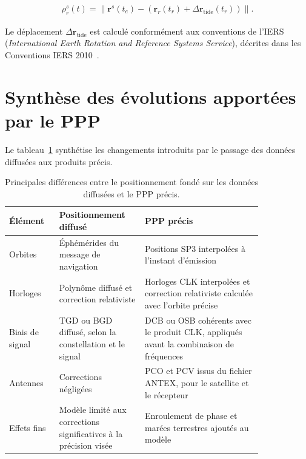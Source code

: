 \begin{align}
\rho_r^s(t)
=
\left\|
\mathbf r^s(t_e)
-\left(\mathbf r_r(t_r)
+\Delta\mathbf r_{\mathrm{tide}}(t_r)\right)
\right\|.
\label{eq:solid_tides_geometry}
\end{align}

Le déplacement $\Delta\mathbf r_{\mathrm{tide}}$ est calculé conformément
aux conventions de l'IERS (\textit{International Earth Rotation and Reference
Systems Service}), décrites dans les Conventions IERS 2010~\cite{iers2010}.

\section{Synthèse des évolutions apportées par le PPP}

Le tableau~\ref{tab:broadcast_vs_ppp} synthétise les changements introduits par
le passage des données diffusées aux produits précis.

\begin{table}[htbp]
    \centering
    \small
    \renewcommand{\arraystretch}{1.25}
    \begin{tabular}{|p{0.16\linewidth}|p{0.27\linewidth}|p{0.40\linewidth}|}
        \hline
        \textbf{Élément} & \textbf{Positionnement diffusé} & \textbf{PPP précis} \\
        \hline
        Orbites
        & Éphémérides du message de navigation
        & Positions SP3 interpolées à l'instant d'émission \\
        \hline
        Horloges
        & Polynôme diffusé et correction relativiste
        & Horloges CLK interpolées et correction relativiste calculée avec
        l'orbite précise \\
        \hline
        Biais de signal
        & TGD ou BGD diffusé, selon la constellation et le signal
        & DCB ou OSB cohérents avec le produit CLK, appliqués avant la
        combinaison de fréquences \\
        \hline
        Antennes
        & Corrections négligées 
        & PCO et PCV issus du fichier ANTEX, pour le satellite et le récepteur \\
        \hline
        Effets fins
        & Modèle limité aux corrections significatives à la précision visée
        & Enroulement de phase et marées terrestres ajoutés au modèle \\
        \hline
    \end{tabular}
    \caption{Principales différences entre le positionnement fondé sur les
    données diffusées et le PPP précis.}
    \label{tab:broadcast_vs_ppp}
\end{table}

